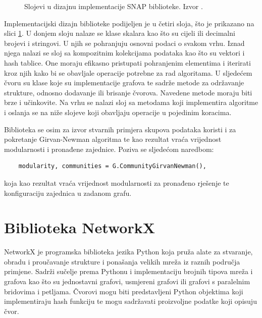 \begin{figure}
	\caption{Slojevi u dizajnu implementacije SNAP biblioteke. Izvor \cite{leskovec2016snap}.}
	\label{fig:SNAP_design}
\end{figure}

Implementacijski dizajn biblioteke podijeljen je u četiri sloja, što je prikazano na slici \ref{fig:SNAP_design}. U donjem sloju nalaze se klase skalara kao što su cijeli ili decimalni brojevi i stringovi. U njih se pohranjuju osnovni podaci o svakom vrhu. Iznad njega nalazi se sloj sa kompozitnim kolekcijama podataka kao što su vektori i hash tablice. One moraju efikasno pristupati pohranjenim elementima i iterirati kroz njih kako bi se obavljale operacije potrebne za rad algoritama. U sljedećem čvoru su klase koje su implementacije grafova te sadrže metode za održavanje strukture, odnosno dodavanje ili brisanje čvorova. Navedene metode moraju biti brze i učinkovite. Na vrhu se nalazi sloj sa metodama koji implementira algoritme i oslanja se na niže slojeve koji obavljaju operacije u pojedinim koracima.

Biblioteka se osim za izvor stvarnih primjera skupova podataka koristi i za pokretanje Girvan-Newman algoritma te kao rezultat vraća vrijednost modularnosti i pronađene zajednice. Poziva se sljedećom naredbom:
\begin{verbatim}
	modularity, communities = G.CommunityGirvanNewman(),
\end{verbatim} 
koja kao rezultat vraća vrijednost modularnosti za pronađeno rješenje te konfiguraciju zajednica u zadanom grafu.



\section{Biblioteka NetworkX}
NetworkX \cite{SciPyProceedings_11} je programska biblioteka jezika Python koja pruža alate za stvaranje, obradu i proučavanje strukture i ponašanja velikih mreža iz raznih područja primjene. Sadrži sučelje prema Pythonu i implementaciju brojnih tipova mreža i grafova kao što su jednostavni grafovi, usmjereni grafovi ili grafovi s paralelnim bridovima i petljama. Čvorovi mogu biti predstavljeni Python objektima koji implementiraju hash funkciju te mogu sadržavati proizvoljne podatke koji opisuju čvor.


